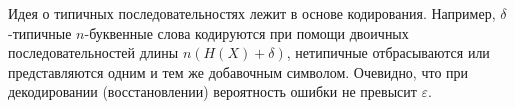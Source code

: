 \begin{remark} Идея о типичных последовательностях лежит в основе кодирования. Например, $\delta$-типичные $n$-буквенные слова кодируются при помощи двоичных последовательностей длины $n(H(X) + \delta)$, нетипичные отбрасываются или представляются одним и тем же добавочным символом. Очевидно, что при декодировании (восстановлении) вероятность ошибки не превысит $\varepsilon$.
\end{remark}
\begin{comment}
\begin{problem} Рассмотрите связь между доказательством принципа асимптотической равнораспределенности и эквивалентностью (для больших систем)энтропий Больцмана и Гиббса.
\end{problem}
\end{comment}

\begin{comment}
\begin{problem}
Всего существует $2^{n\log m}$ $n$-буквенных случайных текстов над алфавитом $(x_1,\ldots,x_m)$. Для их кодирования понадобиться $n\log m$ бит. Предполагая, что все буквы появляются независимо друг от друга по закону $(p_1,\ldots,p_m)$, который в общем случае не является равномерным, предложите лучший способ кодирования, основанный 
на законе больших чисел.
\begin{ordre}
Воспользуйтесь результатами, полученными в предыдущих задачах.
\end{ordre}
\end{problem}

\begin{remark}
Необходимым и достаточным условием существования префиксных кодов является неравенство Крафта -- Макмиллана. 
Пусть $n_1,..., n_k$ - длины кодовых слов, тогда $\sum_{i=1}^k 2^{-n_i} \leq 1$.
Тогда задача о построении кода минимальной средней длины может быть сформулирована следующим образом:
задан вектор $(p_1,...,p_k)$, $\sum p_i = 1$. Найти $n_1,..., n_k$, $n_i > 0$, для которых выполнено
неравенство Крафта -- Макмиллана, а $\sum_{i=1}^k p_in_i \rightarrow \min$, где минимум берется по всем возможным наборам
$n_1,..., n_k$.
Решением этой оптимизационной задачи является \textit{код Хаффмена}. 

\end{remark}
\end{comment}

